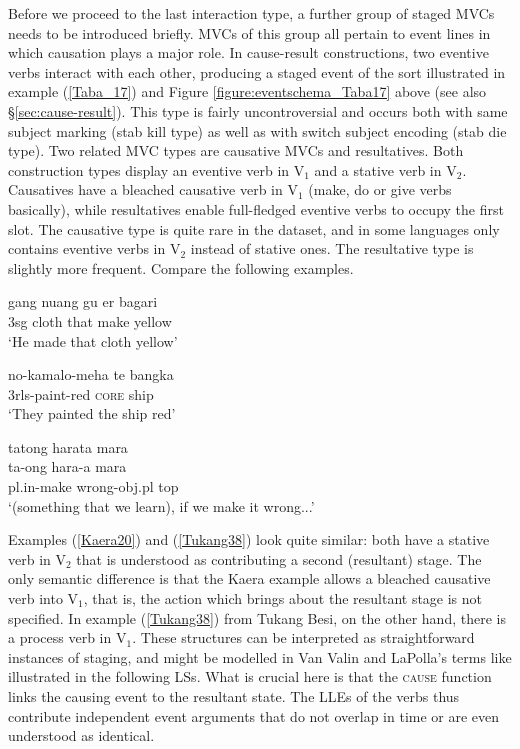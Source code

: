 Before we proceed to the last interaction type, a further group of staged MVCs needs to be introduced briefly. MVCs of this group all pertain to event lines in which causation plays a major role. In cause-result constructions, two eventive verbs interact with each other, producing a staged event of the sort illustrated in example (\ref{Taba_17}) and Figure \ref{figure:eventschema_Taba17} above (see also §\ref{sec:cause-result}). This type is fairly uncontroversial and occurs both with same subject marking (stab kill type) as well as with switch subject encoding (stab die type). Two related MVC types are causative MVCs and resultatives. Both construction types display an eventive verb in V$_1$ and a stative verb in V$_2$. Causatives have a bleached causative verb in V$_1$ (make, do or give verbs basically), while resultatives enable full-fledged eventive verbs to occupy the first slot. The causative type is quite rare in the dataset, and in some languages only contains eventive verbs in V$_2$ instead of stative ones. The resultative type is slightly more frequent. Compare the following examples.

\ea \label{Kaera20}
 
\gll gang nuang gu er bagari \\
3\acs{sg} cloth that make yellow \\
\glft `He made that cloth yellow' \ 
\z
\xe
\ea \label{Tukang38}
 
\gll no-kamalo-meha te bangka \\
3\acs{rls}-paint-red \textsc{core} ship \\
\glft `They painted the ship red' \ 
\z
\xe
\ea \label{Wooi31}
 
\gll tatong harata mara \\
ta-ong hara-a mara \\
\acs{pl}.\acs{in}-make wrong-\acs{obj}.\acs{pl} \acs{top}\\
\glft `(something that we learn), if we make it wrong...' \ 
\z
\xe

Examples (\ref{Kaera20}) and (\ref{Tukang38}) look quite similar: both have a stative verb in V$_2$ that is understood as contributing a second (resultant) stage. The only semantic difference is that the Kaera example allows a bleached causative verb into V$_1$, that is, the action which brings about the resultant stage is not specified. In example (\ref{Tukang38}) from Tukang Besi, on the other hand, there is a process verb in V$_1$. These structures can be interpreted as straightforward instances of staging, and might be modelled in Van Valin and LaPolla's terms like illustrated in the following LSs. What is crucial here is that the \textsc{cause} function links the causing event to the resultant state. The LLEs of the verbs thus contribute independent event arguments that do not overlap in time or are even understood as identical.


